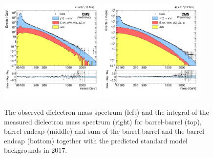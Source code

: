 \begin{figure}[!htbp]
\begin{center}
    \includegraphics[width=0.47\textwidth]{figures/Zprime/2017/mass/massHist}
    \includegraphics[width=0.47\textwidth]{figures/Zprime/2017/mass/cMassHist}
    \caption{The observed dielectron mass spectrum (left) and the integral of the measured dielectron mass spectrum (right) for barrel-barrel (top), barrel-endcap (middle) and sum of the barrel-barrel and the barrel-endcap (bottom) together with the predicted standard model backgrounds in 2017.}
    \label{mass_2017}
  \end{center}
\end{figure}

